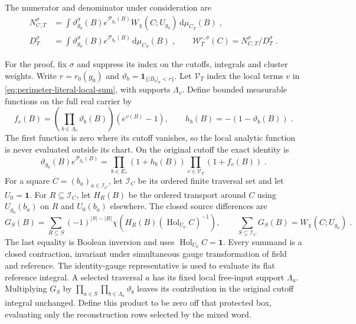 \documentclass[11pt]{article}
\newcommand{\dd}{\mathrm{d}}
\newcommand{\Hol}{\operatorname{Hol}}
\newcommand{\id}{\mathbf 1}
\begin{document}
The numerator and denominator under consideration are
\begin{equation}\label{eq:marginal-literal-ratio}
    \begin{aligned}
        N_{C,T}^{\sigma}&=\int\vartheta_{g_0}^{\sigma}(B)e^{\mathcal P_{g_0}(B)}
            W_\chi(C;U_{g_0})\,\dd\mu_{C_T}(B)\;,\\
        D_T^{\sigma}&=\int\vartheta_{g_0}^{\sigma}(B)e^{\mathcal P_{g_0}(B)}
            \,\dd\mu_{C_T}(B)\;,
        \qquad \mathcal W_T^{\circ,\sigma}(C)=N_{C,T}^{\sigma}/D_T^{\sigma}\;.
    \end{aligned}
\end{equation}

For the proof, fix $\sigma$ and suppress its index on the cutoffs, integrals and cluster weights. Write $r=r_0(g_0)$ and $\vartheta_b=\mathbf1_{\{|B_b|_\sigma<r\}}$. Let $\mathcal V_T$ index the local terms $v$ in \eqref{eq:perimeter-literal-local-sum}, with supports $\Lambda_v$. Define bounded measurable functions on the full real carrier by
\begin{equation}\label{eq:marginal-local-vertices}
    f_v(B)=\left(\prod_{b\in \Lambda_v}\vartheta_b(B)\right)
        (e^{v(B)}-1),
    \qquad h_b(B)=-(1-\vartheta_b(B))\;.
\end{equation}
The first function is zero where its cutoff vanishes, so the local analytic function is never evaluated outside its chart. On the original cutoff the exact identity is
\begin{equation}\label{eq:marginal-original-weight}
    \vartheta_{g_0}(B)e^{\mathcal P_{g_0}(B)}
        =\prod_{b\in E_*}(1+h_b(B))
            \prod_{v\in \mathcal V_T}(1+f_v(B))\;.
\end{equation}
For a square $C=(b_a)_{a\in\mathcal I_C}$, let $\mathcal I_C$ be its ordered finite traversal set and let $U_0=\id$. For $R\subseteq\mathcal I_C$, let $H_R(B)$ be the ordered transport around $C$ using $U_{g_0}(b_a)$ on $R$ and $U_0(b_a)$ elsewhere. The closed source differences are
\begin{equation}\label{eq:finite-source-closed-differences}
    G_S(B)=\sum_{R\subseteq S}(-1)^{|S|-|R|}
        \chi\left(H_R(B)(\Hol_{U_0}C)^{-1}\right),
    \qquad \sum_{S\subseteq\mathcal I_C}G_S(B)
        =W_\chi(C;U_{g_0})\;.
\end{equation}
The last equality is Boolean inversion and uses $\Hol_{U_0}C=\id$. Every summand is a closed contraction, invariant under simultaneous gauge transformation of field and reference. The identity-gauge representative is used to evaluate its flat reference integral.
A selected traversal $a$ has its fixed local free-input support $\Lambda_a$. Multiplying $G_S$ by $\prod_{a\in S}\prod_{b\in \Lambda_a}\vartheta_b$ leaves its contribution in the original cutoff integral unchanged. Define this product to be zero off that protected box, evaluating only the reconstruction rows selected by the mixed word.
\end{document}

